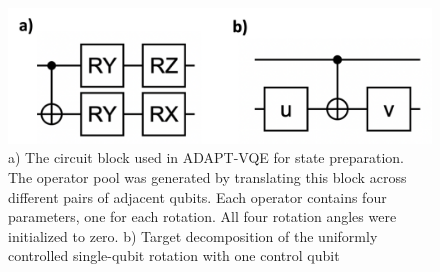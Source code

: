 \begin{figure}[h]
\centering
\includegraphics[width=0.6\linewidth]{main/figs/sfig_2.png}
\caption{a) The circuit block used in ADAPT-VQE for state preparation. The operator
pool was generated by translating this block across different pairs of 
adjacent qubits. Each operator contains four parameters, one for each rotation.
All four rotation angles were initialized to zero. b) Target decomposition of the uniformly controlled single-qubit rotation with one control qubit}
\label{sfig2}
\end{figure}






\clearpage